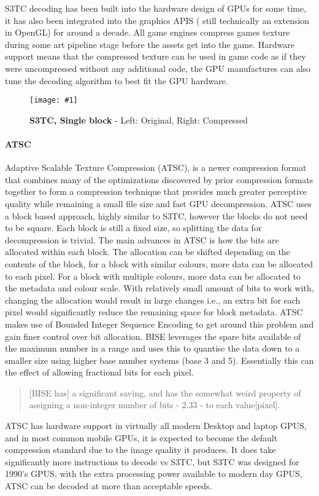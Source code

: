 \documentclass[12pt,a4paper]{article}
\newcommand{\figuremacroF}[4]{
	\begin{figure*}[t] %
		\centering
		\texttt{[image: \#1]}
		\caption[#2]{\textbf{#2} - #3}
		\label{fig:#1}
	\end{figure*}
}
\begin{document}
S3TC decoding has been built into the hardware design of GPUs for some time, it has also been integrated into the graphics APIS ( still technically an extension in OpenGL) for around a decade. All game engines compress games texture during some art pipeline stage before the assets get into the game. Hardware support means that the compressed texture can be used in game code as if they were uncompressed without any additional code, the GPU manufactures can also tune the decoding algorithm to best fit the GPU hardware. 

	\figuremacroF
	{dxt}
	{S3TC, Single block}
	{Left: Original, Right: Compressed \cite{dxtimg}}
	{0.45}
	
\paragraph{ATSC}
Adaptive Scalable Texture Compression (ATSC), is a newer compression format that combines many of the optimizations discovered by prior compression formats together to form a compression technique that provides much greater perceptive quality while remaining a small file size and fast GPU decompression. ATSC uses a block based approach, highly similar to S3TC, however the blocks do not need to be square. Each block is still a fixed size, so splitting the data for decompression is trivial. The main advances in ATSC is how the bits are allocated within each block. The allocation can be shifted depending on the contents of the block, for a block with similar colours, more data can be allocated to each pixel. For a block with multiple colours, more data can be allocated to the metadata and colour scale. With relatively small amount of bits to work with, changing the allocation would result in large changes i.e., an extra bit for each pixel would significantly reduce the remaining space for block metadata. ATSC makes use of Bounded Integer Sequence Encoding to get around this problem and gain finer control over bit allocation. BISE leverages the spare bits available of the maximum number in a range and uses this to quantise the data down to a smaller size using higher base number systems (base 3 and 5). Essentially this can the effect of allowing fractional bits for each pixel.

\blockquote[\cite{astsinfo}]{[BISE has] a significant saving, and has the somewhat weird property of assigning a non-integer number of bits - 2.33 - to each value[pixel].}

ATSC has hardware support in virtually all modern Desktop and laptop GPUS, and in most common mobile GPUs, it is expected to become the default compression standard due to the image quality it produces. It does take significantly more instructions to decode vs S3TC, but S3TC was designed for 1990’s GPUS, with the extra processing power available to modern day GPUS, ATSC can be decoded at more than acceptable speeds. 
\end{document}

